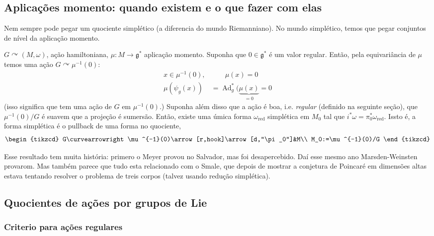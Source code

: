 \subsection{Aplicações momento: quando existem e o que fazer com elas}

Nem sempre pode pegar um quociente simplético (a diferencia do mundo Riemanniano). No mundo simplético, temos que pegar conjuntos de nível da aplicação momento.

\begin{thm}\leavevmode
	$G\curvearrowright(M,\omega)$, ação hamiltoniana, $\mu:M\to \mathfrak{g}^*$ aplicação momento. Suponha que $0\in\mathfrak{g}^*$ é um valor regular. Então, pela equivariância de $\mu$ temos uma ação $G \curvearrowright \mu^{-1}(0)$:
	\begin{align*}
		x\in\mu^{-1}(0),&\qquad \mu(x)=0\\
		\mu(\psi_g(x))& =\operatorname{Ad}^* _g(\underbrace{\mu(x)}_{=0}=0
	\end{align*}
	(isso significa que tem uma ação de $G$ em $\mu^{-1}(0)$.) Suponha além disso que a ação é boa, i.e. \textit{regular} (definido na seguinte seção), que $\mu^{-1}(0)/G$ é suavem que a projeção  é sumersão. Então, existe uma úmica forma $\omega_{\operatorname{red}}$ simplética em $M_0$ tal que  $i^*\omega=\pi_0^*\omega_{\operatorname{red}}$. Issto é, a forma simplética é o pullback de uma forma no quociente,
	\[\begin{tikzcd}
		G\curvearrowright \mu^{-1}(0)\arrow[r,hook]\arrow[d,"\pi_0"]&M\\
M_0:=\mu^{-1}(0)/G
	\end{tikzcd}\]
\end{thm}

\begin{remark}\leavevmode
	Esse resultado tem muita história: primero o Meyer provou no Salvador, mas foi desapercebido. Daí esse mesmo ano Marsden-Weinsten provarom. Mas também parece que tudo esta relacionado com o Smale, que depois de mostrar a conjetura de Poincaré em dimensões altas estava tentando resolver o problema de treis corpos (talvez usando redução simplética).
\end{remark}

\subsection{Quocientes de ações por grupos de Lie}

\subsubsection{Criterio para ações regulares}

